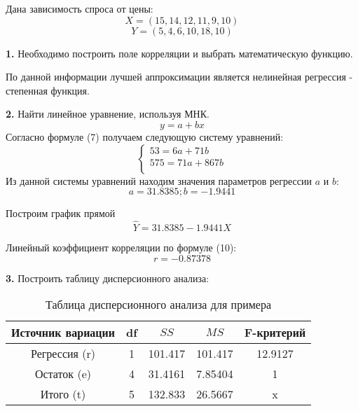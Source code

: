 \documentclass[aps,%
12pt,%
final,%
oneside,
onecolumn,%
musixtex, %
superscriptaddress,%
centertags]{article} %
\begin{document}
Дана зависимость спроса от цены:
$$ X = (15,14,12,11,9,10) $$
$$ Y = (5,4,6,10,18,10) $$

\textbf{1.} Необходимо построить поле корреляции и выбрать математическую функцию.

\begin{center}
\end{center}

По данной информации лучшей аппроксимации является нелинейная регрессия - степенная функция.

\textbf{2.} Найти линейное уравнение, используя МНК.
$$y = a + bx$$
Согласно формуле (7) получаем следующую систему уравнений:
$$ \left\{
\begin{matrix}
53 = 6a + 71b \\
575 = 71a + 867b \\
\end{matrix} \right. $$
Из данной системы уравнений находим значения параметров регрессии $a$ и $b$:
$$ a = 31.8385; b = -1.9441$$

Построим график прямой $$\widehat{Y} = 31.8385 -1.9441X$$
\begin{center}
\end{center}

Линейный коэффициент корреляции по формуле (10):
$$ r = -0.87378$$

\textbf{3.} Построить таблицу дисперсионного анализа:

\label{first_table_analiz}
\begin{table}[H]
	\begin{center}
		\begin{tabular}[t]{|c|c|c|c|c|} \hline
		Источник вариации & df & $SS$ & $MS$ & F-критерий\\ \hline
		Регрессия (r) & 1 & 101.417 & 101.417 & 12.9127 \\ \hline
		Остаток (e)& 4 & 31.4161 & 7.85404 & 1 \\ \hline
		Итого (t)& 5 & 132.833 & 26.5667 & x \\ \hline
		\end{tabular}
	\caption{Таблица дисперсионного анализа для примера}
	\end{center}
\end{table}
\end{document}
